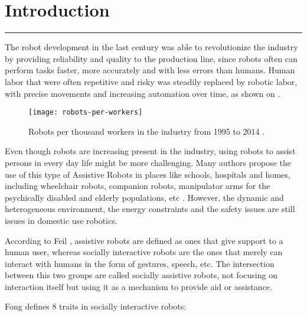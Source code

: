 \chapter{Introduction}\label{chp:intro}
\vspace{-1.5cm}
\noindent\rule{\columnwidth}{1.2mm}
\vspace{0.1cm}

The robot development in the last century was able to revolutionize the industry by providing reliability and quality to the production line, since robots often can perform tasks faster, more accurately and with less errors than humans. Human labor that were often repetitive and risky was steadily replaced by robotic labor, with precise movements and increasing automation over time, as shown on .

\begin{figure}[!ht]
    \centering
    \texttt{[image: robots-per-workers]}
    \caption{Robots per thousand workers in the industry from 1995 to 2014 \cite{dauth2017german}.}
    \label{fig:robots-per-workers}
\end{figure}

Even though robots are increasing present in the industry, using robots to assist persons in every day life might be more challenging. Many authors propose the use of this type of Assistive Robots in places like schools, hospitals and homes, including wheelchair robots, companion robots, manipulator arms for the psychically disabled and elderly populations, etc \cite{feil2005defining}. However, the dynamic and heterogeneous environment, the energy constraints and the safety issues are still issues in domestic use robotics.

According to Feil \cite{feil2005defining}, assistive robots are defined as ones that give support to a human user, whereas socially interactive robots are the ones that merely can interact with humans in the form of gestures, speech, etc. The intersection between this two groups are called socially assistive robots, not focusing on interaction itself but using it as a mechanism to provide aid or assistance.

Fong \cite{fong2003survey} defines 8 traits in socially interactive robots:

